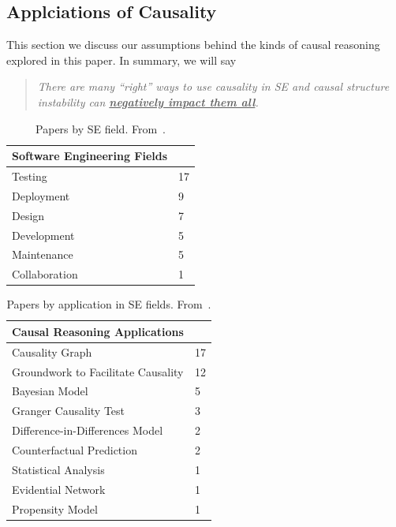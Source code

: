 \documentclass[]{svjour3}
\newif\ifblueresponse
\newcommand{\here}[2]{%
  \hypertarget{#1}{%
    \ifblueresponse
      \textbf{#1} \textcolor{blue}{#2}%
    \else
      #2%
    \fi
  }%
  \label{#1}%
}
\begin{document}
 \subsection{Applciations of Causality}

 \here{E1}{This section we discuss  our assumptions behind the kinds of causal reasoning explored in this paper.  In summary, we will say 
 \begin{quote}
 {\em There are many ``right'' ways to use causality in SE and  causal structure instability can  \underline{\bf negatively impact them all}. }
 \end{quote}}


\begin{table}[t!]
    \centering
    \caption{Papers by SE field. From~\cite{nasir}.}\label{field}
    \begin{tabular}{ll}
        \hline
        \textbf{Software Engineering Fields} &  \\
        \hline
        Testing & 17 \\
        Deployment & 9 \\
        Design & 7 \\
        Development & 5 \\
        Maintenance & 5 \\
        Collaboration & 1 \\
        \hline
    \end{tabular}
\end{table}

\begin{table}[t!]
    \centering
    \caption{Papers by application in SE fields. From~\cite{nasirXXX}.}\label{apps}
    \begin{tabular}{ll}
        \hline
        \textbf{Causal Reasoning Applications} &  \\
        \hline
        Causality Graph & 17 \\
        Groundwork to Facilitate Causality & 12 \\
        Bayesian Model & 5 \\
        Granger Causality Test & 3 \\
        Difference-in-Differences Model & 2 \\
        Counterfactual Prediction & 2 \\
        Statistical Analysis & 1 \\
        Evidential Network & 1 \\
        Propensity Model & 1 \\
        \hline
    \end{tabular}
\end{table}
\end{document}
